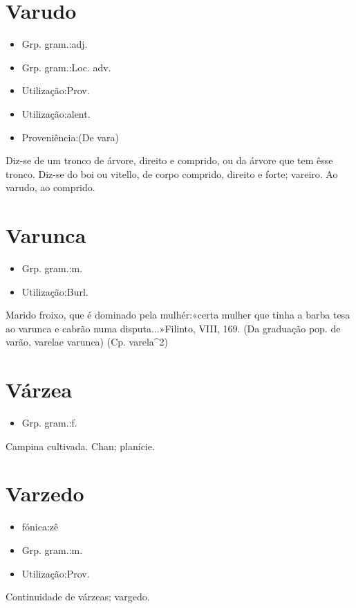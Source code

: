 \documentclass{article}
\begin{document}
\section{Varudo}
\begin{itemize}
\item {Grp. gram.:adj.}
\end{itemize}
\begin{itemize}
\item {Grp. gram.:Loc. adv.}
\end{itemize}
\begin{itemize}
\item {Utilização:Prov.}
\end{itemize}
\begin{itemize}
\item {Utilização:alent.}
\end{itemize}
\begin{itemize}
\item {Proveniência:(De \textunderscore vara\textunderscore )}
\end{itemize}
Diz-se de um tronco de árvore, direito e comprido, ou da árvore que tem êsse tronco.
Diz-se do boi ou vitello, de corpo comprido, direito e forte; vareiro.
\textunderscore Ao varudo\textunderscore , ao comprido.
\section{Varunca}
\begin{itemize}
\item {Grp. gram.:m.}
\end{itemize}
\begin{itemize}
\item {Utilização:Burl.}
\end{itemize}
Marido froixo, que é dominado pela mulhér:«\textunderscore certa mulher que tinha a barba tesa ao varunca e cabrão numa disputa...\textunderscore »Filinto, VIII, 169.
(Da graduação pop. de \textunderscore varão\textunderscore , \textunderscore varela\textunderscore  e \textunderscore varunca\textunderscore )
(Cp. \textunderscore varela\textunderscore ^2)
\section{Várzea}
\begin{itemize}
\item {Grp. gram.:f.}
\end{itemize}
Campina cultivada.
Chan; planície.
\section{Varzedo}
\begin{itemize}
\item {fónica:zê}
\end{itemize}
\begin{itemize}
\item {Grp. gram.:m.}
\end{itemize}
\begin{itemize}
\item {Utilização:Prov.}
\end{itemize}
Continuidade de várzeas; vargedo.
\end{document}
